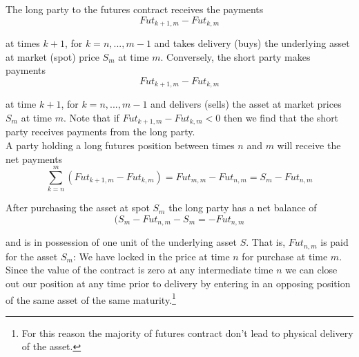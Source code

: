 \documentclass[12pt]{article}
\newlength\tindent
\renewcommand{\indent}{\hspace*{\tindent}}
\begin{document}
The long party to the futures contract receives the payments
\begin{equation*}
	Fut_{k + 1,m} - Fut_{k,m}
\end{equation*}

at times $k + 1$, for $k = n,...,m - 1$ and takes delivery (buys) the underlying asset at market (spot) price $S_m$ at time $m$. Conversely, the short party makes payments
\begin{equation*}
	Fut_{k + 1,m} - Fut_{k,m}
\end{equation*}

at time $k + 1$, for $k = n,...,m - 1$ and delivers (sells) the asset at market prices $S_m$ at time $m$. Note that if $Fut_{k + 1,m} - Fut_{k,m} < 0$ then we find that the short party receives payments from the long party. \\

A party holding a long futures position between times $n$ and $m$ will receive the net payments
\begin{equation*}
	\sum^m_{k = n} \left( Fut_{k + 1,m} - Fut_{k,m} \right) = Fut_{m,m} - Fut_{n,m} = S_m - Fut_{n,m}
\end{equation*}

After purchasing the asset at spot $S_m$ the long party has a net balance of 
\begin{equation*}
	(S_m - Fut_{n,m} - S_m = -Fut_{n,m}
\end{equation*}

and is in possession of one unit of the underlying asset $S$. That is, $Fut_{n,m}$ is paid for the asset $S_m$: We have locked in the price at time $n$ for purchase at time $m$. \\

\indent Since the value of the contract is zero at any intermediate time $n$ we can close out our position at any time prior to delivery by entering in an opposing position of the same asset of the same maturity.\footnote{For this reason the majority of futures contract don't lead to physical delivery of the asset.} \\
\end{document}
